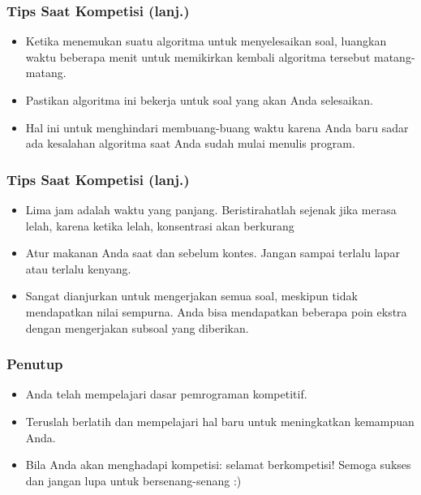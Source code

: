 \begin{frame}
  \frametitle{Tips Saat Kompetisi (lanj.)}
  \begin{itemize}
    \item Ketika menemukan suatu algoritma untuk menyelesaikan soal, luangkan waktu beberapa menit untuk memikirkan kembali algoritma tersebut matang-matang. 
    \item Pastikan algoritma ini bekerja untuk soal yang akan Anda selesaikan. 
    \item Hal ini untuk menghindari membuang-buang waktu karena Anda baru sadar ada kesalahan algoritma saat Anda sudah mulai menulis program.
  \end{itemize}
\end{frame}


\begin{frame}
  \frametitle{Tips Saat Kompetisi (lanj.)}
  \begin{itemize}
    \item Lima jam adalah waktu yang panjang. Beristirahatlah sejenak jika merasa lelah, karena ketika lelah, konsentrasi akan berkurang
    \item Atur makanan Anda saat dan sebelum kontes. Jangan sampai terlalu lapar atau terlalu kenyang.
    \item Sangat dianjurkan untuk mengerjakan semua soal, meskipun tidak mendapatkan nilai sempurna. Anda bisa mendapatkan beberapa poin ekstra dengan mengerjakan subsoal yang diberikan.
  \end{itemize}
\end{frame}

\begin{frame}
  \frametitle{Penutup}
  \begin{itemize}
    \item Anda telah mempelajari dasar pemrograman kompetitif.
    \item Teruslah berlatih dan mempelajari hal baru untuk meningkatkan kemampuan Anda.
    \item Bila Anda akan menghadapi kompetisi: selamat berkompetisi!\newline
    Semoga sukses dan jangan lupa untuk bersenang-senang :)
  \end{itemize}
\end{frame}


